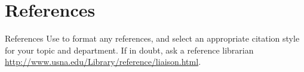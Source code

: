 \documentclass[pdf]{beamer}
\begin{document}
\begin{frame}{}
\begin{columns}[T]
\begin{column}{0.25\textwidth}
\section*{References}
\begin{block}{References}
Use  to format any references, and select an appropriate citation style for your topic and department. If in doubt, ask a reference librarian \href{http://www.usna.edu/Library/reference/liaison.html}{http://www.usna.edu/Library/reference/liaison.html}.
\end{block}
\end{column}

\end{columns}
\end{frame}
\end{document}
